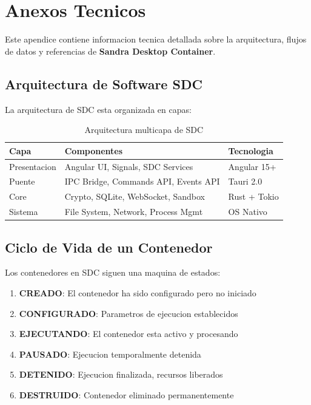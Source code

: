 
\chapter{Anexos Tecnicos}
\label{ch:anexos}

Este apendice contiene informacion tecnica detallada sobre la arquitectura, flujos de datos y referencias de \textbf{Sandra Desktop Container}.

\section{Arquitectura de Software SDC}
\label{sec:arquitectura}

La arquitectura de SDC esta organizada en capas:

\begin{table}[H]
\centering
\begin{tabular}{p{4cm}p{5cm}p{5cm}}
\toprule
\textbf{Capa} & \textbf{Componentes} & \textbf{Tecnologia} \\
\midrule
Presentacion & Angular UI, Signals, SDC Services & Angular 15+ \\
\midrule
Puente & IPC Bridge, Commands API, Events API & Tauri 2.0 \\
\midrule
Core & Crypto, SQLite, WebSocket, Sandbox & Rust + Tokio \\
\midrule
Sistema & File System, Network, Process Mgmt & OS Nativo \\
\bottomrule
\end{tabular}
\caption{Arquitectura multicapa de SDC}
\label{tab:arquitectura-sdc}
\end{table}

\section{Ciclo de Vida de un Contenedor}
\label{sec:ciclo-vida}

Los contenedores en SDC siguen una maquina de estados:

\begin{enumerate}
    \item \textbf{CREADO}: El contenedor ha sido configurado pero no iniciado
    \item \textbf{CONFIGURADO}: Parametros de ejecucion establecidos
    \item \textbf{EJECUTANDO}: El contenedor esta activo y procesando
    \item \textbf{PAUSADO}: Ejecucion temporalmente detenida
    \item \textbf{DETENIDO}: Ejecucion finalizada, recursos liberados
    \item \textbf{DESTRUIDO}: Contenedor eliminado permanentemente
\end{enumerate}

